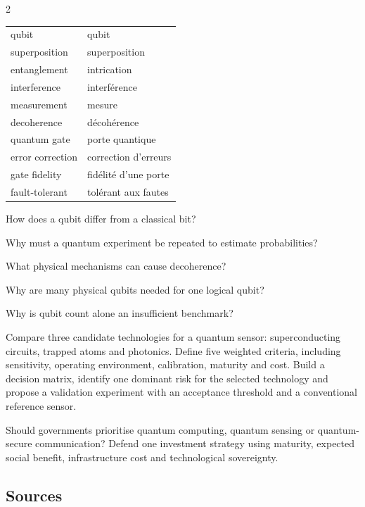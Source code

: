 \begin{multicols}{2}
\begin{vocabulary}
\begin{tabularx}{\linewidth}{@{}lX@{}}
qubit & qubit\\
superposition & superposition\\
entanglement & intrication\\
interference & interférence\\
measurement & mesure\\
decoherence & décohérence\\
quantum gate & porte quantique\\
error correction & correction d’erreurs\\
gate fidelity & fidélité d’une porte\\
fault-tolerant & tolérant aux fautes
\end{tabularx}
\end{vocabulary}

\begin{questions}
\item How does a qubit differ from a classical bit?
\item Why must a quantum experiment be repeated to estimate probabilities?
\item What physical mechanisms can cause decoherence?
\item Why are many physical qubits needed for one logical qubit?
\item Why is qubit count alone an insufficient benchmark?
\end{questions}

\begin{engineeringchallenge}
Compare three candidate technologies for a quantum sensor: superconducting circuits, trapped atoms and photonics.
Define five weighted criteria, including sensitivity, operating environment, calibration, maturity and cost. Build a
decision matrix, identify one dominant risk for the selected technology and propose a validation experiment with an
acceptance threshold and a conventional reference sensor.
\end{engineeringchallenge}

\begin{speaking}
Should governments prioritise quantum computing, quantum sensing or quantum-secure communication? Defend one
investment strategy using maturity, expected social benefit, infrastructure cost and technological sovereignty.
\end{speaking}
\end{multicols}

\subsection*{Sources}
